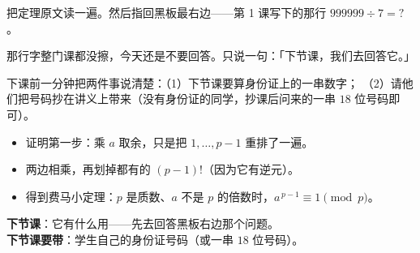 把定理原文读一遍。然后指回黑板最右边——第 1 课写下的那行 \(999999\div7=?\)。

\begin{zhu}
  那行字整门课都没擦，今天还是不要回答。只说一句：「下节课，我们去回答它。」
\end{zhu}

\begin{zhu}
  下课前一分钟把两件事说清楚：（1）下节课要算身份证上的一串数字；
  （2）请他们把号码抄在讲义上带来（没有身份证的同学，抄课后问来的一串 \(18\) 位号码即可）。
\end{zhu}

\begin{xiaojie}
  \begin{itemize}
    \item 证明第一步：乘 \(a\) 取余，只是把 \(1,\dots,p-1\) 重排了一遍。
    \item 两边相乘，再划掉都有的 \((p-1)!\)（因为它有逆元）。
    \item 得到费马小定理：\(p\) 是质数、\(a\) 不是 \(p\) 的倍数时，\(a^{\,p-1}\equiv1\pmod p\)。
  \end{itemize}
\end{xiaojie}

\noindent\textbf{下节课}：它有什么用——先去回答黑板右边那个问题。\\
\textbf{下节课要带}：学生自己的身份证号码（或一串 \(18\) 位号码）。
